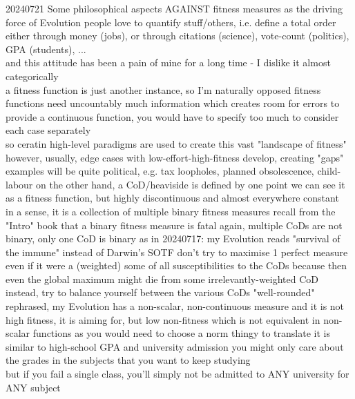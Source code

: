 \documentclass{article}\usepackage[margin=2cm]{geometry}
\begin{document}
\begin{cascade}
    20240721
    \stepin
    Some philosophical aspects AGAINST fitness measures as the driving force of Evolution
    \stepin
    people love to quantify stuff/others, i.e. define a total order
    \stepin
    either through money (jobs), or through citations (science), vote-count (politics), GPA (students), ...\\
    and this attitude has been a pain of mine for a long time - I dislike it almost categorically\\
    a fitness function is just another instance, so I'm naturally opposed
    \stepout
    fitness functions need uncountably much information which creates room for errors
    \stepin
    to provide a continuous function, you would have to specify too much to consider each case separately\\
    so ceratin high-level paradigms are used to create this vast "landscape of fitness"\\
    however, usually, edge cases with low-effort-high-fitness develop, creating "gaps"
    \stepin
    examples will be quite political, e.g. tax loopholes, planned obsolescence, child-labour
    \stepout
    \stepout
    on the other hand, a CoD/heaviside is defined by one point
    \stepin
    we can see it as a fitness function, but highly discontinuous and almost everywhere constant\\
    in a sense, it is a collection of multiple binary fitness measures
    \stepin
    recall from the "Intro" book that a binary fitness measure is fatal
    \stepin
    again, multiple CoDs are not binary, only one CoD is binary
    \stepout
    \stepout
    \stepout
    as in 20240717: my Evolution reads "survival of the immune" instead of Darwin's SOTF
    \stepin
    don't try to maximise 1 perfect measure
    \stepin
    even if it were a (weighted) some of all susceptibilities to the CoDs
    \stepin
    because then even the global maximum might die from some irrelevantly-weighted CoD
    \stepout
    \stepout
    instead, try to balance yourself between the various CoDs
    \stepin
    "well-rounded"
    \stepout
    rephrased, my Evolution has a non-scalar, non-continuous measure
    \stepin
    and it is not high fitness, it is aiming for, but low non-fitness
    \stepin
    which is not equivalent in non-scalar functions
    \stepin
    as you would need to choose a norm thingy to translate
    \stepout
    \stepout
    \stepout
    it is similar to high-school GPA and university admission
    \stepin
    you might only care about the grades in the subjects that you want to keep studying\\
    but if you fail a single class, you'll simply not be admitted to ANY university for ANY subject
\end{cascade}
\end{document}
